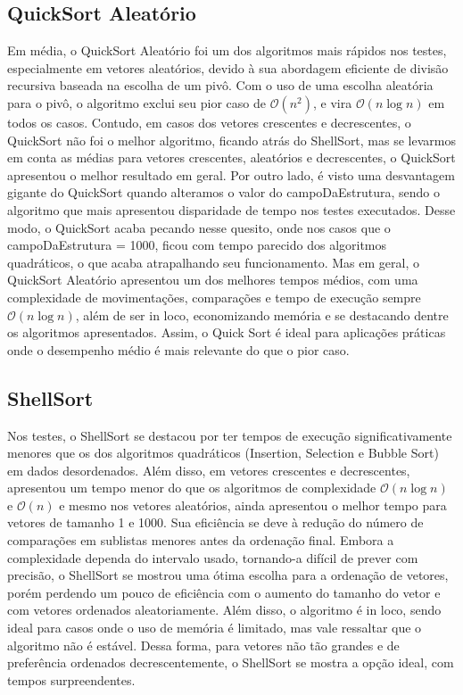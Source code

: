 \documentclass[a4paper, 12pt]{article}
\begin{document}
\subsection{QuickSort Aleatório}
Em média, o QuickSort Aleatório foi um dos algoritmos mais rápidos nos testes, especialmente em vetores aleatórios, devido à sua abordagem eficiente de divisão recursiva baseada na escolha de um pivô. Com o uso de uma escolha aleatória para o pivô, o algoritmo exclui seu pior caso de \( \mathcal{O}(n^2) \), e vira \( \mathcal{O}(n \log n) \) em todos os casos. Contudo, em casos dos vetores crescentes e decrescentes, o QuickSort não foi o melhor algoritmo, ficando atrás do ShellSort, mas se levarmos em conta as médias para vetores crescentes, aleatórios e decrescentes, o QuickSort apresentou o melhor resultado em geral. Por outro lado, é visto uma desvantagem gigante do QuickSort quando alteramos o valor do campoDaEstrutura, sendo o algoritmo que mais apresentou disparidade de tempo nos testes executados. Desse modo, o QuickSort acaba pecando nesse quesito, onde nos casos que o campoDaEstrutura = 1000, ficou com tempo parecido dos algoritmos quadráticos, o que acaba atrapalhando seu funcionamento. Mas em geral, o QuickSort Aleatório apresentou um dos melhores tempos médios, com uma complexidade de movimentações, comparações e tempo de execução sempre \( \mathcal{O}(n \log n) \), além de ser in loco, economizando memória e se destacando dentre os algoritmos apresentados. Assim, o Quick Sort é ideal para aplicações práticas onde o desempenho médio é mais relevante do que o pior caso.

 \subsection{ShellSort}
 Nos testes, o ShellSort se destacou por ter tempos de execução significativamente menores que os dos algoritmos quadráticos (Insertion, Selection e Bubble Sort) em dados desordenados. Além disso, em vetores crescentes e decrescentes, apresentou um tempo menor do que os algoritmos de complexidade \( \mathcal{O}(n \log n) \) e \( \mathcal{O}(n)  \) e mesmo nos vetores aleatórios, ainda apresentou o melhor tempo para vetores de tamanho 1 e 1000. Sua eficiência se deve à redução do número de comparações em sublistas menores antes da ordenação final. Embora a complexidade dependa do intervalo usado, tornando-a difícil de prever com precisão, o ShellSort se mostrou uma ótima escolha para a ordenação de vetores, porém perdendo um pouco de eficiência com o aumento do tamanho do vetor e com vetores ordenados aleatoriamente. Além disso, o algoritmo é in loco, sendo ideal para casos onde o uso de memória é limitado, mas vale ressaltar que o algoritmo não é estável. Dessa forma, para vetores não tão grandes e de preferência ordenados decrescentemente, o ShellSort se mostra a opção ideal, com tempos surpreendentes.
\end{document}
